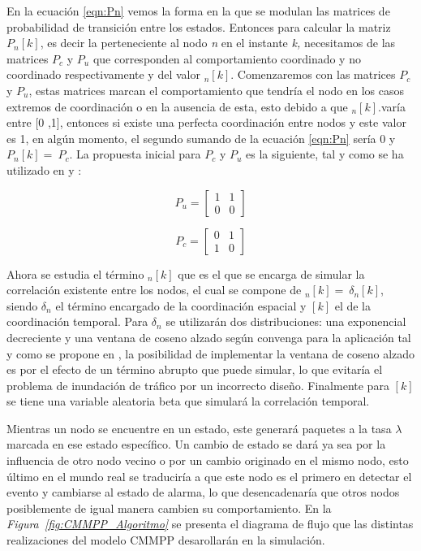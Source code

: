 En la ecuación \ref{eqn:Pn} vemos la forma en la que se modulan las matrices de probabilidad de transición entre los estados. Entonces para calcular la matriz $P_n\left[k\right]$, es decir la perteneciente al nodo \textit{n }en el instante \textit{k, }necesitamos de las matrices $P_c$ y $P_u$ que corresponden al comportamiento coordinado y no coordinado respectivamente y del valor $_n\left[k\right]$. Comenzaremos con las matrices $P_c$ y $P_u$, estas matrices marcan el comportamiento que tendría el nodo en los casos extremos de coordinación o en la ausencia de esta, esto debido a que $_n\left[k\right]$.varía entre [0 ,1], entonces si existe una perfecta coordinación entre nodos y este valor es 1, en algún momento, el segundo sumando de la ecuación \ref{eqn:Pn} sería 0 y $P_n\left[k\right]=\ P_c$. La propuesta inicial para $P_c$ y $P_u$ es la siguiente, tal y como se ha utilizado en \parencite{Gupta2018} y \parencite{Smiljkovic2014}:

\begin{equation}
P_{u} =  
\begin{bmatrix}
1 & 1 \\
0 & 0 
\end{bmatrix}
\end{equation}

\begin{equation}
P_{c} = 
\begin{bmatrix}
0 & 1 \\
1 & 0 
\end{bmatrix}
\end{equation}

Ahora se estudia el término $_n\left[k\right]$ que es el que se encarga de simular la correlación existente entre los nodos, el cual se compone de $_n\left[k\right]=\ {\delta }_n[k]$, siendo ${\delta }_n$ el término encargado de la coordinación espacial y $[k]$ el de la coordinación temporal. Para ${\delta }_n$ se utilizarán dos distribuciones: una exponencial decreciente y una ventana de coseno alzado según convenga para la aplicación tal y como se propone en \parencite{Gupta2018}, la posibilidad de implementar la ventana de coseno alzado es por el efecto de un término abrupto que puede simular, lo que evitaría el problema de inundación de tráfico por un incorrecto diseño. Finalmente para $[k]$ se tiene una variable aleatoria beta\textit{ }que simulará la correlación temporal. \newline

Mientras un nodo se encuentre en un estado, este generará paquetes a la tasa $\lambda$ marcada en ese estado específico. Un cambio de estado se dará ya sea por la influencia de otro nodo vecino o por un cambio originado en el mismo nodo, esto último en el mundo real se traduciría a que este nodo es el primero en detectar el evento y cambiarse al estado de alarma, lo que desencadenaría que otros nodos posiblemente de igual manera cambien su comportamiento. En la \textit{Figura~\ref{fig:CMMPP_Algoritmo}} se presenta el diagrama de flujo que las distintas realizaciones del modelo CMMPP desarollarán en la simulación.\newline

